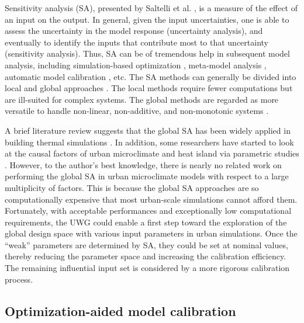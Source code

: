 Sensitivity analysis (SA), presented by Saltelli et al. \cite{saltelli2004sensitivity}, is a measure of the effect of an input on the output. In general, given the input uncertainties, one is able to assess the uncertainty in the model response (uncertainty analysis), and eventually to identify the inputs that contribute most to that uncertainty (sensitivity analysis). Thus, SA can be of tremendous help in subsequent model analysis, including simulation-based optimization \cite{nguyen2014review}, meta-model analysis \cite{mao2016towards}, automatic model calibration \cite{heo2012calibration}, etc. The SA methods can generally be divided into local and global approaches \cite{saltelli2004sensitivity}. The local methods require fewer computations but are ill-suited for complex systems. The global methods are regarded as more versatile to handle non-linear, non-additive, and non-monotonic systems \cite{tian2013review}.

A brief literature review suggests that the global SA has been widely applied in building thermal simulations \cite{macdonald2002quantifying, heiselberg2009application, de2009identification, eisenhower2012uncertainty, nguyen2015performance, menberg2016sensitivity}. In addition, some researchers have started to look at the causal factors of urban microclimate and heat island via parametric studies \cite{salamanca2010new, lee2008vegetated, martin2015estimation, bueno2013urban, nakano2015urban, hamdi2008inclusion}. However, to the author's best knowledge, there is nearly no related work on performing the global SA in urban microclimate models with respect to a large multiplicity of factors. This is because the global SA approaches are so computationally expensive that most urban-scale simulations cannot afford them. Fortunately, with acceptable performances and exceptionally low computational requirements, the UWG could enable a first step toward the exploration of the global design space with various input parameters in urban simulations. Once the ``weak'' parameters are determined by SA, they could be set at nominal values, thereby reducing the parameter space and increasing the calibration efficiency. The remaining influential input set is considered by a more rigorous calibration process.

\subsection{Optimization-aided model calibration}

